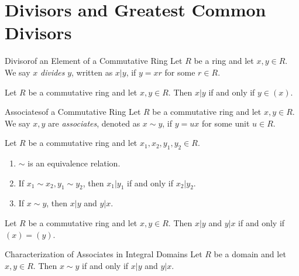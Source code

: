 \documentclass[pmath347]{subfiles}
\begin{document}

    \section{Divisors and Greatest Common Divisors}
    
    \begin{definition}{Divisor}{of an Element of a Commutative Ring}
        Let $R$ be a ring and let $x,y\in R$. We say $x$ \emph{divides} $y$, written as $x|y$, if $y=xr$ for some $r\in R$.
    \end{definition}

    \begin{prop}{}
        Let $R$ be a commutative ring and let $x,y\in R$. Then $x|y$ if and only if $y\in \left( x \right) $.
    \end{prop}

    \begin{definition}{Associates}{of a Commutative Ring}
        Let $R$ be a commutative ring and let $x,y\in R$. We say $x,y$ are \emph{associates}, denoted as $x\sim y$, if $y=ux$ for some unit $u\in R$.
    \end{definition}

    \begin{prop}{}
        Let $R$ be a commutative ring and let $x_1,x_2,y_1,y_2\in R$.
        \begin{enumerate}
            \item $\sim$ is an equivalence relation.
            \item If $x_1\sim x_2, y_1\sim y_2$, then $x_1|y_1$ if and only if $x_2|y_2$.
            \item If $x\sim y$, then $x|y$ and $y|x$.
        \end{enumerate}
    \end{prop}

    \begin{prop}{}
        Let $R$ be a commutative ring and let $x,y\in R$. Then $x|y$ and $y|x$ if and only if $\left( x \right) = \left( y \right)$.
    \end{prop}

    \begin{prop}{Characterization of Associates in Integral Domains}
        Let $R$ be a domain and let $x,y\in R$. Then $x\sim y$ if and only if $x|y$ and $y|x$.
    \end{prop}
\end{document}
